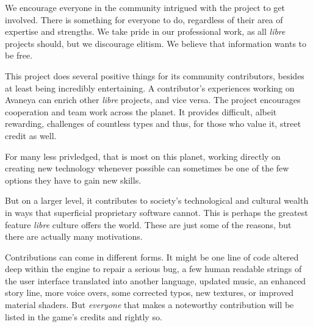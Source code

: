 
We encourage everyone in the community intrigued with the project to get involved. There is something for everyone to do, regardless of their area of expertise and strengths. We take pride in our professional work, as all {\it libre} projects should, but we discourage elitism. We believe that information wants to be free.

    {}

This project does several positive things for its community contributors, besides at least being incredibly entertaining. A contributor's experiences working on Avaneya can enrich other {\it libre} projects, and vice versa. The project encourages cooperation and team work across the planet. It provides difficult, albeit rewarding, challenges of countless types and thus, for those who value it, street credit as well. 

For many less privledged, that is most on this planet, working directly on creating new technology whenever possible can sometimes be one of the few options they have to gain new skills.

But on a larger level, it contributes to society's technological and cultural wealth in ways that superficial proprietary software cannot. This is perhaps the greatest feature {\it libre} culture offers the world. These are just some of the reasons, but there are actually many motivations.


Contributions can come in different forms. It might be one line of code altered deep within the engine to repair a serious bug, a few human readable strings of the user interface translated into another language, updated music, an enhanced story line, more voice overs, some corrected typos, new textures, or improved material shaders. But {\it everyone} that makes a noteworthy contribution will be listed in the game's credits and rightly so.

